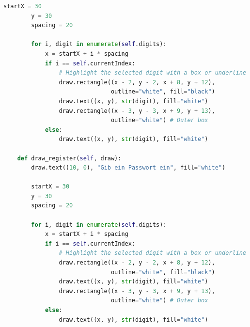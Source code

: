 \begin{scriptsize}
\begin{lstlisting}[style=Python, language=Python, captionpos=b, stepnumber=5, caption={login.py}, label={lst:login}]
        startX = 30
        y = 30
        spacing = 20

        for i, digit in enumerate(self.digits):
            x = startX + i * spacing
            if i == self.currentIndex:
                # Highlight the selected digit with a box or underline
                draw.rectangle((x - 2, y - 2, x + 8, y + 12),
                               outline="white", fill="black")
                draw.text((x, y), str(digit), fill="white")
                draw.rectangle((x - 3, y - 3, x + 9, y + 13),
                               outline="white") # Outer box
            else:
                draw.text((x, y), str(digit), fill="white")

    def draw_register(self, draw):
        draw.text((10, 0), "Gib ein Passwort ein", fill="white")
        
        startX = 30
        y = 30
        spacing = 20
        
        for i, digit in enumerate(self.digits):
            x = startX + i * spacing
            if i == self.currentIndex:
                # Highlight the selected digit with a box or underline
                draw.rectangle((x - 2, y - 2, x + 8, y + 12),
                               outline="white", fill="black")
                draw.text((x, y), str(digit), fill="white")
                draw.rectangle((x - 3, y - 3, x + 9, y + 13),
                               outline="white") # Outer box
            else:
                draw.text((x, y), str(digit), fill="white")

\end{lstlisting}
\end{scriptsize}

